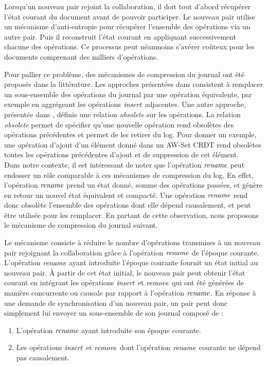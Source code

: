 Lorsqu'un nouveau pair rejoint la collaboration, il doit tout d'abord récupérer l'état courant du document avant de pouvoir participer.
Le nouveau pair utilise un mécanisme d'anti-entropie \cite{1983-anti-entropy-vv} pour récupérer l'ensemble des opérations via un autre pair.
Puis il reconstruit l'état courant en appliquant successivement chacune des opérations.
Ce processus peut néanmoins s'avérer coûteux pour les documents comprenant des milliers d'opérations.

Pour pallier ce problème, des mécanismes de compression du journal ont été proposés dans la littérature.
Les approches présentées dans \cite{2002-log-compression-op-based-vcs-shen-sun, 2006-these-claudia} consistent à remplacer un sous-ensemble des opérations du journal par une opération équivalente, par exemple en aggrégeant les opérations $\mathit{insert}$ adjacentes.
Une autre approche, présentée dans \cite{2014-making-op-based-crdts-op-based}, définie une relation \emph{obsolete} sur les opérations.
La relation \emph{obsolete} permet de spécifier qu'une nouvelle opération rend obsolètes des opérations précédentes et permet de les retirer du log.
Pour donner un exemple, une opération d'ajout d'un élément donné dans un AW-Set \ac{CRDT} rend obsolètes toutes les opérations précédentes d'ajout et de suppression de cet élément.\\

Dans notre contexte, il est intéressant de noter que l'opération $\mathit{rename}$ peut endosser un rôle comparable à ces mécanismes de compression du log.
En effet, l'opération $\mathit{rename}$ prend un état donné, somme des opérations passées, et génère en retour un nouvel état équivalent et compacté.
Une opération $\mathit{rename}$ rend donc obsolète l'ensemble des opérations dont elle dépend causalement, et peut être utilisée pour les remplacer.
En partant de cette observation, nous proposons le mécanisme de compression du journal suivant.

Le mécanisme consiste à réduire le nombre d'opérations transmises à un nouveau pair rejoignant la collaboration grâce à l'opération $\mathit{rename}$ de l'époque courante.
L'opération $\mathit{rename}$ ayant introduite l'époque courante fournit un état initial au nouveau pair.
À partir de cet état initial, le nouveau pair peut obtenir l'état courant en intégrant les opérations $\mathit{insert}$ et $\mathit{remove}$ qui ont été générées de manière concurrente ou causale par rapport à l'opération $\mathit{rename}$.
En réponse à une demande de synchronisation d'un nouveau pair, un pair peut donc simplement lui envoyer un sous-ensemble de son journal composé de :
\begin{enumerate}
  \item L'opération $\mathit{rename}$ ayant introduite son époque courante.
  \item Les opérations $\mathit{insert}$ et $\mathit{remove}$ dont l'opération $\mathit{rename}$ courante ne dépend pas causalement.
\end{enumerate}

